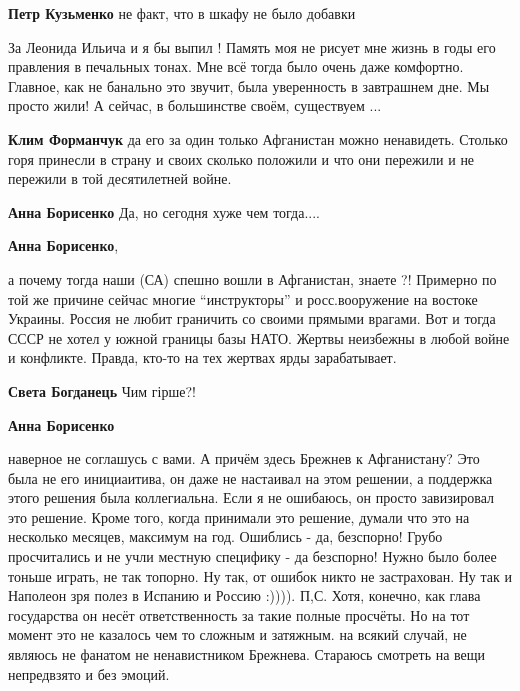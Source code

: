 \begin{itemize}
\begin{itemize}
\textbf{Петр Кузьменко} не факт, что в шкафу не было добавки
\end{itemize} %


За Леонида Ильича и я бы выпил ! Память моя не рисует мне жизнь в годы его
правления в печальных тонах. Мне всё тогда было очень даже комфортно. Главное,
как не банально это звучит, была уверенность в завтрашнем дне. Мы просто жили!
А сейчас, в большинстве своём, существуем ...

\begin{itemize} %
\textbf{Клим Форманчук} да его за один только Афганистан можно ненавидеть. Столько горя принесли в страну и своих сколько положили и что они пережили и не пережили в той десятилетней войне.

\begin{itemize} %
\textbf{Анна Борисенко} Да, но сегодня хуже чем тогда....

\textbf{Анна Борисенко}, 

а почему тогда наши (СА) спешно вошли в Афганистан, знаете ?! Примерно по той
же причине сейчас многие \enquote{инструкторы} и росс.вооружение на востоке Украины.
Россия не любит граничить со своими прямыми врагами. Вот и тогда СССР не хотел
у южной границы базы НАТО. Жертвы неизбежны в любой войне и конфликте. Правда,
кто-то на тех жертвах ярды зарабатывает.

\textbf{Света Богданець} Чим гірше?!

\textbf{Анна Борисенко} 

наверное не соглашусь с вами. А причём здесь Брежнев к Афганистану? Это была не
его инициаитива, он даже не настаивал на этом решении, а поддержка этого
решения была коллегиальна. Если я не ошибаюсь, он просто завизировал это
решение. Кроме того, когда принимали это решение, думали что это на несколько
месяцев, максимум на год. Ошиблись - да, безспорно! Грубо просчитались и не
учли местную специфику - да безспорно! Нужно было более тоньше играть, не так
топорно. Ну так, от ошибок никто не застрахован. Ну так и Наполеон зря полез в
Испанию и Россию :)))). П,С. Хотя, конечно, как глава государства он несёт
ответственность за такие полные просчёты. Но на тот момент это не казалось чем
то сложным и затяжным. на всякий случай, не являюсь не фанатом не ненавистником
Брежнева. Стараюсь смотреть на вещи непредвзято и без эмоций.


\end{itemize}
\end{itemize}
\end{itemize}
